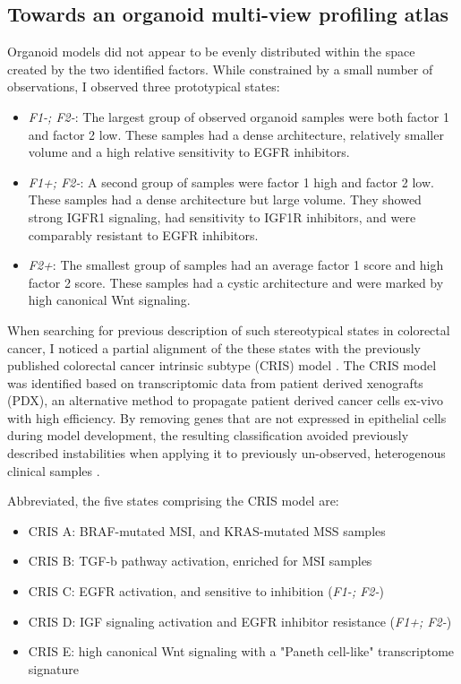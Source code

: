 \begin{flushleft}
\subsection{Towards an organoid multi-view profiling atlas}
Organoid models did not appear to be evenly distributed within the space created by the two identified factors. While constrained by a small number of observations, I observed three prototypical states:
\begin{itemize} 
    \item \textit{F1-; F2-}: The largest group of observed organoid samples were both factor 1 and factor 2 low. These samples had a dense architecture, relatively smaller volume and a high relative sensitivity to EGFR inhibitors. 
    \item \textit{F1+; F2-}: A second group of samples were factor 1 high and factor 2 low. These samples had a dense architecture but large volume. They showed strong IGFR1 signaling, had sensitivity to IGF1R inhibitors, and were comparably resistant to EGFR inhibitors. 
    \item \textit{F2+}: The smallest group of samples had an average factor 1 score and high factor 2 score. These samples had a cystic architecture and were marked by high canonical Wnt signaling. 
\end{itemize}

When searching for previous description of such stereotypical states in colorectal cancer, I noticed a partial alignment of the these states with the previously published colorectal cancer intrinsic subtype (CRIS) model \cite{isellaSelectiveAnalysisCancercell2017a}. The CRIS model was identified based on transcriptomic data from patient derived xenografts (PDX), an alternative method to propagate patient derived cancer cells ex-vivo with high efficiency. By removing genes that are not expressed in epithelial cells during model development, the resulting classification avoided previously described instabilities when applying it to previously un-observed, heterogenous clinical samples \cite{dunneCancercellIntrinsicGene2017}.

Abbreviated, the five states comprising the CRIS model are: 
\begin{itemize} 
    \item CRIS A: BRAF-mutated MSI, and KRAS-mutated MSS samples
    \item CRIS B: TGF-b pathway activation, enriched for MSI samples 
    \item CRIS C: EGFR activation, and sensitive to inhibition (\textit{F1-; F2-})
    \item CRIS D: IGF signaling activation and EGFR inhibitor resistance (\textit{F1+; F2-}) 
    \item CRIS E: high canonical Wnt signaling with a "Paneth cell-like" transcriptome signature
\end{itemize}


\end{flushleft}
